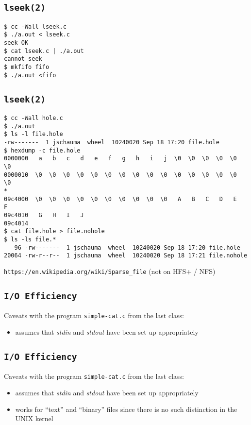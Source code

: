 \documentclass[xga]{xdvislides}
\begin{document}
\subsection{{\tt lseek(2)}}
\begin{verbatim}
$ cc -Wall lseek.c
$ ./a.out < lseek.c
seek OK
$ cat lseek.c | ./a.out
cannot seek
$ mkfifo fifo
$ ./a.out <fifo

\end{verbatim}



\subsection{{\tt lseek(2)}}
\begin{verbatim}
$ cc -Wall hole.c
$ ./a.out
$ ls -l file.hole
-rw-------  1 jschauma  wheel  10240020 Sep 18 17:20 file.hole
$ hexdump -c file.hole
0000000   a   b   c   d   e   f   g   h   i   j  \0  \0  \0  \0  \0  \0
0000010  \0  \0  \0  \0  \0  \0  \0  \0  \0  \0  \0  \0  \0  \0  \0  \0
*
09c4000  \0  \0  \0  \0  \0  \0  \0  \0  \0  \0   A   B   C   D   E   F
09c4010   G   H   I   J
09c4014
$ cat file.hole > file.nohole
$ ls -ls file.*
   96 -rw-------  1 jschauma  wheel  10240020 Sep 18 17:20 file.hole
20064 -rw-r--r--  1 jschauma  wheel  10240020 Sep 18 17:21 file.nohole
\end{verbatim}

\verb+https://en.wikipedia.org/wiki/Sparse_file+ (not on HFS+ / NFS)


\subsection{{\tt I/O Efficiency}}
Caveats with the program {\tt simple-cat.c} from the last class:
\begin{itemize}
	\item assumes that {\em stdin} and {\em stdout} have been set up
		appropriately
\end{itemize}

\subsection{{\tt I/O Efficiency}}
Caveats with the program {\tt simple-cat.c} from the last class:
\begin{itemize}
	\item assumes that {\em stdin} and {\em stdout} have been set up
		appropriately
	\item works for ``text'' and ``binary'' files since there is no such
		distinction in the UNIX kernel
\end{itemize}
\end{document}
